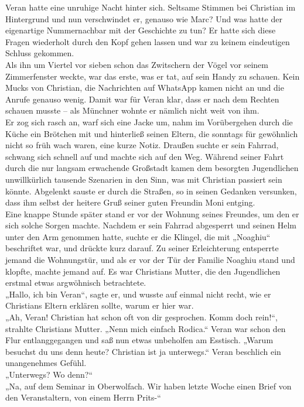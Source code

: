 \documentclass[oneside]{memoir}
\begin{document}
\medskip
\noindent Veran hatte eine unruhige Nacht hinter sich. Seltsame Stimmen bei Christian im Hintergrund und nun verschwindet er, genauso wie Marc? Und was hatte der eigenartige Nummernachbar mit der Geschichte zu tun? Er hatte sich diese Fragen wiederholt durch den Kopf gehen lassen und war zu keinem eindeutigen Schluss gekommen. \\
Als ihn um Viertel vor sieben schon das Zwitschern der Vögel vor seinem Zimmerfenster weckte, war das erste, was er tat, auf sein Handy zu schauen. Kein Mucks von Christian, die Nachrichten auf WhatsApp kamen nicht an und die Anrufe genauso wenig. Damit war für Veran klar, dass er nach dem Rechten schauen musste -- als Münchner wohnte er nämlich nicht weit von ihm. \\
Er zog sich rasch an, warf sich eine Jacke um, nahm im Vorübergehen durch die Küche ein Brötchen mit und hinterließ seinen Eltern, die sonntags für gewöhnlich nicht so früh wach waren, eine kurze Notiz. Draußen suchte er sein Fahrrad, schwang sich schnell auf und machte sich auf den Weg. Während seiner Fahrt durch die nur langsam erwachende Großstadt kamen dem besorgten Jugendlichen unwillkürlich tausende Szenarien in den Sinn, was mit Christian passiert sein könnte. Abgelenkt sauste er durch die Straßen, so in seinen Gedanken versunken, dass ihm selbst der heitere Gruß seiner guten Freundin Moni entging. \\
Eine knappe Stunde später stand er vor der Wohnung seines Freundes, um den er sich solche Sorgen machte. Nachdem er sein Fahrrad abgesperrt und seinen Helm unter den Arm genommen hatte, suchte er die Klingel, die mit „Noaghiu“ beschriftet war, und drückte kurz darauf. Zu seiner Erleichterung entsperrte jemand die Wohnungstür, und als er vor der Tür der Familie Noaghiu stand und klopfte, machte jemand auf. Es war Christians Mutter, die den Jugendlichen erstmal etwas argwöhnisch betrachtete. \\
„Hallo, ich bin Veran“, sagte er, und wusste auf einmal nicht recht, wie er Christians Eltern erklären sollte, warum er hier war. \\
„Ah, Veran! Christian hat schon oft von dir gesprochen. Komm doch rein!“, strahlte Christians Mutter. „Nenn mich einfach Rodica.“ Veran war schon den Flur entlanggegangen und saß nun etwas unbeholfen am Esstisch. „Warum besuchst du uns denn heute? Christian ist ja unterwegs.“
Veran beschlich ein unangenehmes Gefühl. \\
„Unterwegs? Wo denn?“ \\
„Na, auf dem Seminar in Oberwolfach. Wir haben letzte Woche einen Brief von den Veranstaltern, von einem Herrn Prits-“ \\
\end{document}
